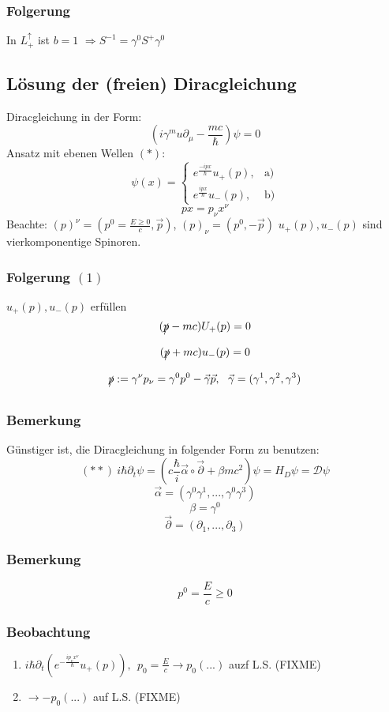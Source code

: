 \documentclass[twoside,a4paper]{scrartcl}
\newcommand{\D}{\mathcal{D}}
\renewcommand{\1}{\mathds{1}}
\newcommand{\Ra}{\Rightarrow}
\newcommand{\ra}{\rightarrow}
\begin{document}
\subsubsection*{Folgerung}
In $L_+^\uparrow$ ist $b=1$ $\Ra S^{-1}=\gamma^0 S^+ \gamma^0$

% 
\subsection{Lösung der (freien) Diracgleichung}
Diracgleichung in der Form:
$$(i\gamma^mu \partial_\mu-\frac{mc}{\hbar})\psi=0$$
Ansatz mit ebenen Wellen $(*)$:
$$\psi(x)=\begin{cases}
  e^{\frac{-ipx}{\hbar}}u_+(p),  & \text{a)}\\
  e^{\frac{ipx}{\hbar}}u_-(p), & \text{b)}
\end{cases}$$
$$px=p_\nu x^\nu$$
Beachte: $(p)^\nu=(p^0=\frac{E\geq 0}{c}, \vec p)$, $(p)_\nu=(p^0,-\vec p)$
$u_+(p), u_-(p)$ sind vierkomponentige Spinoren.
\subsubsection*{Folgerung $(1)$}
$u_+(p), u_-(p)$ erfüllen 
$$(\xout{p}-mc)U_+(p)=0$$
$$(\xout{p}+mc)u_-(p)=0$$
$$\xout{p}:=\gamma^\nu p_\nu=\gamma^0p^0-\vec \gamma \vec p, \ \ \vec \gamma=(\gamma^1,\gamma^2,\gamma^3)$$
\subsubsection*{Bemerkung}
Günstiger ist, die Diracgleichung in folgender Form zu benutzen:
$$(**) \ i\hbar \partial_t \psi=(c \frac{\hbar}{i} \vec \alpha \circ \vec \partial + \beta mc^2)\psi=H_D \psi=\D\psi$$
$$\vec \alpha=(\gamma^0\gamma^1,...,\gamma^0\gamma^3)$$
$$\beta=\gamma^0$$
$$\vec \partial =(\partial_1,...,\partial_3)$$
\subsubsection*{Bemerkung}
$$p^0=\frac{E}{c}\geq 0$$
\subsubsection*{Beobachtung}
\begin{enumerate}
\item $i\hbar \partial_t (e^{-\frac{ip_\nu x^\nu}{\hbar}}u_+(p)), \ \ p_0=\frac{E}{c} \ra p_0(...)$ auzf L.S. (FIXME)
\item $\ra -p_0(...)$ auf L.S. (FIXME) 
\end{enumerate}
\end{document}

